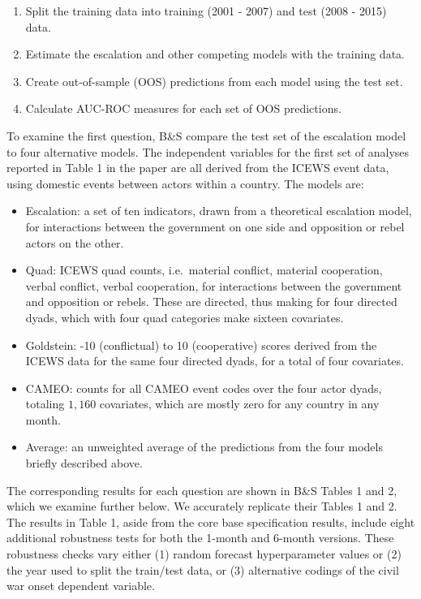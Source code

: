 \documentclass[
]{article}
\providecommand{\tightlist}{%
  \setlength{\itemsep}{0pt}\setlength{\parskip}{0pt}}
\begin{document}
\begin{enumerate}
\def\labelenumi{\arabic{enumi}.}
\tightlist
\item
  Split the training data into training (2001 - 2007) and test (2008 - 2015) data.
\item
  Estimate the escalation and other competing models with the training data.
\item
  Create out-of-sample (OOS) predictions from each model using the test set.
\item
  Calculate AUC-ROC measures for each set of OOS predictions.
\end{enumerate}

To examine the first question, B\&S compare the test set of the escalation model to four alternative models. The independent variables for the first set of analyses reported in Table 1 in the paper are all derived from the ICEWS event data, using domestic events between actors within a country. The models are:

\begin{itemize}
\tightlist
\item
  Escalation: a set of ten indicators, drawn from a theoretical escalation model, for interactions between the government on one side and opposition or rebel actors on the other.
\item
  Quad: ICEWS quad counts, i.e.~material conflict, material cooperation, verbal conflict, verbal cooperation, for interactions between the government and opposition or rebels. These are directed, thus making for four directed dyads, which with four quad categories make sixteen covariates.
\item
  Goldstein: -10 (conflictual) to 10 (cooperative) scores derived from the ICEWS data for the same four directed dyads, for a total of four covariates.
\item
  CAMEO: counts for all CAMEO event codes over the four actor dyads, totaling \(1,160\) covariates, which are mostly zero for any country in any month.
\item
  Average: an unweighted average of the predictions from the four models briefly described above.
\end{itemize}

The corresponding results for each question are shown in B\&S Tables 1 and 2, which we examine further below. We accurately replicate their Tables 1 and 2. The results in Table 1, aside from the core base specification results, include eight additional robustness tests for both the 1-month and 6-month versions. These robustness checks vary either (1) random forecast hyperparameter values or (2) the year used to split the train/test data, or (3) alternative codings of the civil war onset dependent variable.
\end{document}
